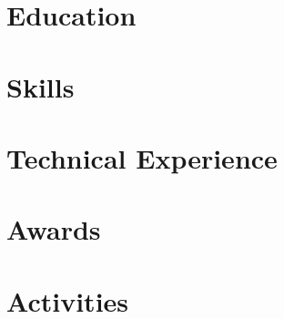 \documentclass[letter,10pt]{article}
\begin{document}


\section{Education}


\section{Skills}


\section{Technical Experience}


\section{Awards}




\section{Activities}

\end{document}
